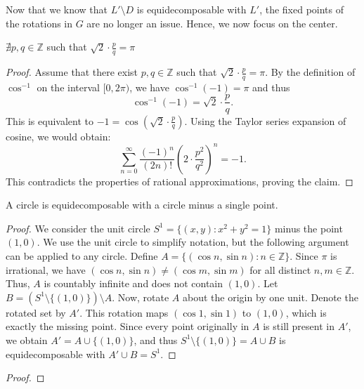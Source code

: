 Now that we know that $L' \setminus D$ is equidecomposable with $L'$, the fixed points of the rotations in $G$ are no longer an issue.
Hence, we now focus on the center.

\begin{lemma} \label{lemma:ncm_pi_sqrt_2}
$\nexists p,q\in \mathbb{Z}$ such that $\sqrt{2} \cdot \frac{p}{q} = \pi$

\end{lemma}
\begin{proof}
Assume that there exist $p,q\in \mathbb{Z}$ such that $\sqrt{2} \cdot \frac{p}{q} = \pi$. By the definition of $\cos^{-1}$ on the interval $[0,2\pi)$, we have $\cos^{-1}(-1) = \pi$ and thus
\[
\cos^{-1}(-1) = \sqrt{2} \cdot \frac{p}{q}.
\]
This is equivalent to $-1 = \cos(\sqrt{2} \cdot \frac{p}{q})$. Using the Taylor series expansion of cosine, we would obtain:
\[
\sum_{n=0}^{\infty} \frac{(-1)^n}{(2n)!} (2 \cdot \frac{p^2}{q^2})^n = -1.
\]
This contradicts the properties of rational approximations, proving the claim.
\end{proof}

\begin{lemma} \label{lemma:equidecomposable_circle}
A circle is equidecomposable with a circle minus a single point.
\end{lemma}
\begin{proof} 

We consider the unit circle $S^1 = \{(x,y) : x^2 + y^2 = 1\}$ minus the point $(1,0)$. We use the unit circle to simplify notation, but the following argument can be applied to any circle.
Define $A = \{(\cos n, \sin n) : n \in \mathbb{Z}\}$. Since $\pi$ is irrational, we have $(\cos n, \sin n) \neq (\cos m, \sin m)$ for all distinct $n, m \in \mathbb{Z}$.
Thus, $A$ is countably infinite and does not contain $(1,0)$. Let $B = (S^1 \setminus \{(1,0)\}) \setminus A$.
Now, rotate $A$ about the origin by one unit. Denote the rotated set by $A'$. This rotation maps $(\cos 1, \sin 1)$ to $(1,0)$,
which is exactly the missing point. Since every point originally in $A$ is still present in $A'$, we obtain $A' = A \cup \{(1,0)\}$,
and thus $S^1 \setminus \{(1,0)\} = A \cup B$ is equidecomposable with $A' \cup B = S^1$.
\end{proof}

\begin{lemma}
\label{lemma:equidecomposable_subset}

\end{lemma}
\begin{proof}

\end{proof}

